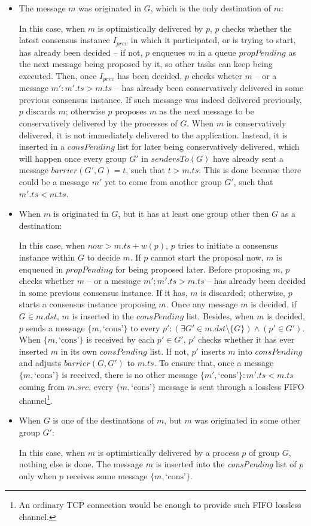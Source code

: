 \documentclass[times, 10pt]{article}
\begin{document}
\begin{itemize}
  \item The message $m$ was originated in $G$, which is the only destination of $m$:
  
  In this case, when $m$ is optimistically delivered by $p$, $p$ checks whether the latest consensus instance $I_{prev}$ in which it participated, or is trying to start, has already been decided -- if not, $p$ enqueues $m$ in a queue $propPending$ as the next message being proposed by it, so other tasks can keep being executed. Then, once $I_{prev}$ has been decided, $p$ checks wheter $m$ -- or a message $m' : m'.ts > m.ts$ -- has already been conservatively delivered in some previous consensus instance. If such message was indeed delivered previously, $p$ discards $m$; otherwise $p$ proposes $m$ as the next message to be conservatively delivered by the processes of $G$. When $m$ is conservatively delivered, it is not immediately delivered to the application. Instead, it is inserted in a $consPending$ list for later being conservatively delivered, which will happen once every group $G'$ in $sendersTo(G)$ have already sent a message $barrier(G',G) = t$, such that $t > m.ts$. This is done because there could be a message $m'$ yet to come from another group $G'$, such that $m'.ts < m.ts$.

  \item When $m$ is originated in $G$, but it has at least one group other then $G$ as a destination:
  
  In this case, when $now > m.ts + w(p)$, $p$ tries to initiate a consensus instance within $G$ to decide $m$. If $p$ cannot start the proposal now, $m$ is enqueued in $propPending$ for being proposed later. Before proposing $m$, $p$ checks whether $m$ -- or a message $m' : m'.ts > m.ts$ -- has already been decided in some previous consensus instance. If it has, $m$ is discarded; otherwise, $p$ starts a consensus instance proposing $m$. Once any message $m$ is decided, if $G \in m.dst$, $m$ is inserted in the $consPending$ list. Besides, when $m$ is decided, $p$ sends a message $\{m, \text{`cons'}\}$ to every \mbox{$p' : (\exists G' \in m.dst \setminus \{G\}) \wedge (p' \in G')$}. When $\{m, \text{`cons'}\}$ is received by each $p' \in G'$, $p'$ checks whether it has ever inserted $m$ in its own $consPending$ list. If not, $p'$ inserts $m$ into $consPending$ and adjusts $barrier(G, G')$ to $m.ts$. To ensure that, once a message $\{m, \text{`cons'}\}$ is received, there is no other message \mbox{$\{m', \text{`cons'}\}:m'.ts<m.ts$} coming from $m.src$, every $\{m, \text{`cons'}\}$ message is sent through a lossless FIFO channel\footnote{An ordinary TCP connection would be enough to provide such FIFO lossless channel.}.
  
  \item When $G$ is one of the destinations of $m$, but $m$ was originated in some other group $G'$:
  
  In this case, when $m$ is optimistically delivered by a process $p$ of group $G$, nothing else is done. The message $m$ is inserted into the \mbox{\textit{consPending}} list of $p$ only when $p$ receives some message $\{m, \text{`cons'}\}$.
\end{itemize}
\end{document}

